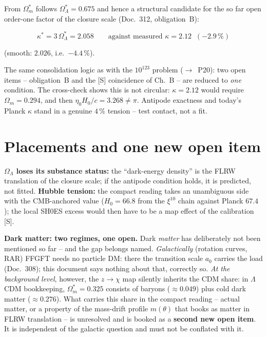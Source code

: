 \documentclass[11pt]{report}
\begin{document}
From $\Omega_m^{*}$ follows $\Omega_\Lambda^{*} = 0.675$ and
hence a structural candidate for the so far open order-one factor
of the closure scale (Doc.~312, obligation~B):

\begin{equation}
  \kappa^{*} = 3\,\Omega_\Lambda^{*} = 2.058
  \qquad\text{against measured } \kappa = 2.12
  \;\;(-2.9\,\%)
\end{equation}

\noindent (smooth: $2.026$, i.e.\ $-4.4\,\%$).

The same consolidation logic as with the $10^{123}$ problem
($\to$~P20): two open items -- obligation~B and the [S]
coincidence of Ch.~B -- are reduced to \emph{one} condition. The
cross-check shows this is not circular: $\kappa = 2.12$ would
require $\Omega_m = 0.294$, and then
$\eta_0 H_0/c = 3.268 \ne \pi$. Antipode exactness and today's
Planck $\kappa$ stand in a genuine $4\,\%$ tension -- test
contact, not a fit.

\section{Placements and one new open item}

\textbf{$\Omega_\Lambda$ loses its substance status:} the
\enquote{dark-energy density} is the FLRW translation of the
closure scale; if the antipode condition holds, it is predicted,
not fitted. \textbf{Hubble tension:} the compact reading takes an
unambiguous side with the CMB-anchored value ($H_0 = 66.8$ from
the $\xi^{10}$ chain against Planck $67.4$); the local SH0ES
excess would then have to be a map effect of the calibration [S].

\textbf{Dark matter: two regimes, one open.} Dark \emph{matter}
has deliberately not been mentioned so far -- and the gap belongs
named. \emph{Galactically} (rotation curves, RAR) FFGFT needs no
particle DM: there the transition scale $a_0$ carries the load
(Doc.~308); this document says nothing about that, correctly so.
\emph{At the background level}, however, the $z\to\chi$ map
silently inherits the CDM share: in $\Lambda$CDM bookkeeping,
$\Omega_m^{*} = 0.325$ consists of baryons ($\approx 0.049$)
plus cold dark matter ($\approx 0.276$). What carries this share
in the compact reading -- actual matter, or a property of the
mass-drift profile $m(\theta)$ that books as matter in FLRW
translation -- is unresolved and is booked as a \textbf{second
new open item}. It is independent of the galactic question and
must not be conflated with it.
\end{document}
